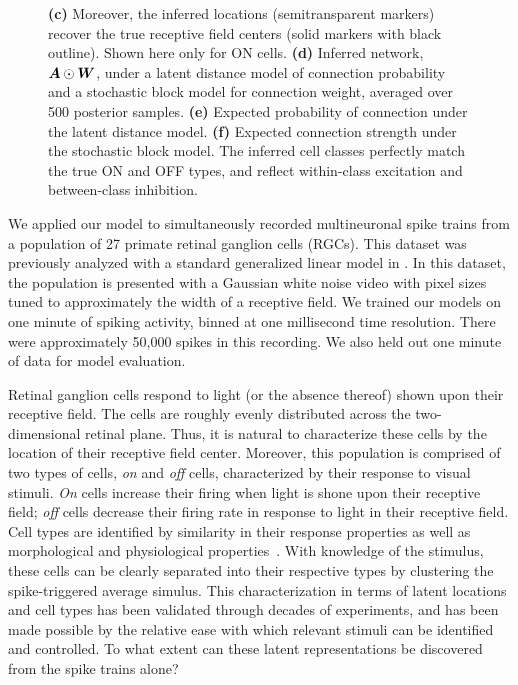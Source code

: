 \begin{figure}[t!]
{    \textbf{(c)} Moreover, the inferred locations (semitransparent markers) recover the true receptive field centers (solid markers with black outline). Shown here only for ON cells.
    \textbf{(d)} Inferred network,~${\boldsymbol{A} \odot \boldsymbol{W}}$, under a latent distance model of connection probability and a stochastic block model for connection weight, averaged over 500 posterior samples.
    \textbf{(e)} Expected probability of connection under the latent distance model.
    \textbf{(f)} Expected connection strength under the stochastic block model. The inferred cell classes perfectly match the true ON and OFF types, and reflect within-class excitation and between-class inhibition.
}
  \label{fig:rgc}
\end{figure}

We applied our model to simultaneously recorded multineuronal spike
trains from a population of 27 primate retinal ganglion cells
(RGCs). This dataset was previously analyzed with a standard
generalized linear model in \cite{Pillow-2008}.  In this dataset, the
population is presented with a Gaussian white noise video with pixel
sizes tuned to approximately the width of a receptive field. We
trained our models on one minute of spiking activity, binned at one
millisecond time resolution. There were approximately 50,000 spikes in
this recording.  We also held out one minute of data for model
evaluation.

Retinal ganglion cells respond to light (or the absence thereof) shown
upon their receptive field. The cells are roughly evenly distributed
across the two-dimensional retinal plane. Thus, it is natural to
characterize these cells by the location of their receptive field
center.  Moreover, this population is comprised of two types of cells,
\textit{on} and \textit{off} cells, characterized by their response to
visual stimuli. \textit{On} cells increase their firing when light is
shone upon their receptive field; \textit{off} cells decrease their
firing rate in response to light in their receptive field.  Cell types
are identified by similarity in their response properties as well as
morphological and physiological properties~\cite{sanes2015types}. With
knowledge of the stimulus, these cells can be clearly separated into
their respective types by clustering the spike-triggered average
simulus.  This characterization in terms of latent locations and cell
types has been validated through decades of experiments, and has been
made possible by the relative ease with which relevant stimuli can be
identified and controlled. To what extent can these latent
representations be discovered from the spike trains alone?

